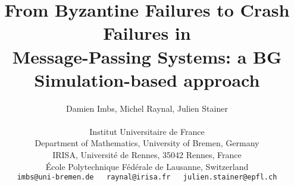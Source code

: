 \documentclass[11pt,letterpaper]{article}
\begin{document}
\title{\bf From Byzantine Failures to Crash Failures in\\ 
             Message-Passing Systems: 
            a BG Simulation-based approach}
\author{Damien Imbs,     Michel Raynal, Julien Stainer\\~\\
 Institut Universitaire de France\\
 Department of Mathematics, University of Bremen, Germany\\
 IRISA, Université de Rennes, 35042 Rennes, France \\
 École Polytechnique Fédérale de Lausanne, Switzerland\\
{\footnotesize {\tt
imbs@uni-bremen.de~~~raynal@irisa.fr~~~julien.stainer@epfl.ch
}}
}

\date{}
\maketitle
\end{document}
